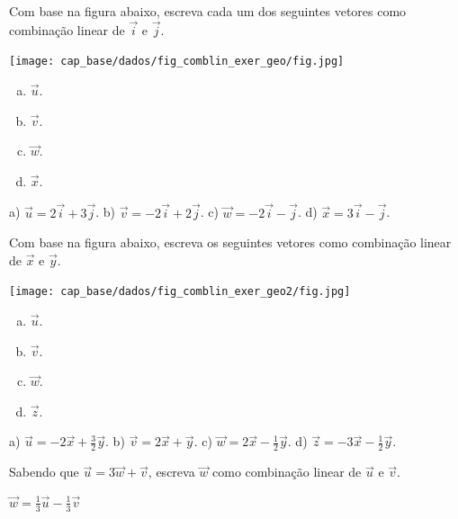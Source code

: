 \begin{exer}\label{cap_base_sec_comblin:exer:comblin_exer_geo}
  Com base na figura abaixo, escreva cada um dos seguintes vetores como combinação linear de $\vec{i}$ e $\vec{j}$.

  \begin{center}
    \texttt{[image: cap\_base/dados/fig\_comblin\_exer\_geo/fig.jpg]}
  \end{center}

  \begin{enumerate}[a)]
    \item $\vec{u}$.
    \item $\vec{v}$.
    \item $\vec{w}$.
    \item $\vec{x}$.
  \end{enumerate}

\end{exer}
\begin{resp}
  a) $\vec{u} = 2\vec{i} + 3\vec{j}$. b) $\vec{v} = -2\vec{i} + 2\vec{j}$. c) $\vec{w} = -2\vec{i} - \vec{j}$. d) $\vec{x} = 3\vec{i} - \vec{j}$.
\end{resp}

\begin{exer}\label{exer:comblin_geo2}
  Com base na figura abaixo, escreva os seguintes vetores como combinação linear de $\vec{x}$ e $\vec{y}$.

  \begin{center}
    \texttt{[image: cap\_base/dados/fig\_comblin\_exer\_geo2/fig.jpg]}
  \end{center}

  \begin{enumerate}[a)]
    \item $\vec{u}$.
    \item $\vec{v}$.
    \item $\vec{w}$.
    \item $\vec{z}$.
  \end{enumerate}

\end{exer}
\begin{resp}
  a) $\vec{u} = -2\vec{x} + \frac{3}{2}\vec{y}$. b) $\vec{v} = 2\vec{x} + \vec{y}$. c) $\vec{w} = 2\vec{x} - \frac{1}{2}\vec{y}$. d) $\vec{z} = -3\vec{x} - \frac{1}{2}\vec{y}$.
\end{resp}


\begin{exer}
  Sabendo que $\vec{u}=3\vec{w}+\vec{v}$, escreva $\vec{w}$ como combinação linear de $\vec{u}$ e $\vec{v}$.
\end{exer}
\begin{resp}
  $\vec{w} = \frac{1}{3}\vec{u} - \frac{1}{3}\vec{v}$
\end{resp}

